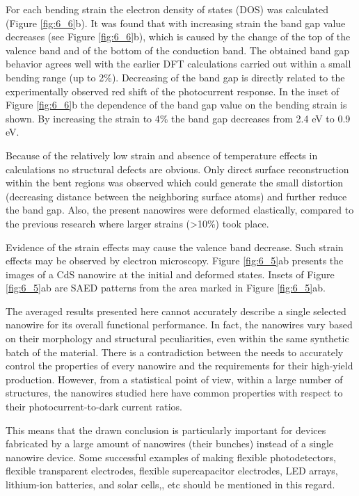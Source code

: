 For each bending strain the electron density of states (DOS) was calculated (Figure \ref{fig:6_6}b). It was found that with increasing strain the band gap value decreases (see Figure \ref{fig:6_6}b), which is caused by the change of the top of the valence band and of the bottom of the conduction band. The obtained band gap behavior agrees well with the earlier DFT calculations carried out within a small bending range (up to 2\%).\cite{Fu2011} Decreasing of the band gap is directly related to the experimentally observed red shift of the photocurrent response. In the inset of Figure \ref{fig:6_6}b the dependence of the band gap value on the bending strain is shown. By increasing the strain to 4\% the band gap decreases from 2.4 eV to 0.9 eV. 

Because of the relatively low strain and absence of temperature effects in calculations no structural defects are obvious. Only direct surface reconstruction within the bent regions was observed which could generate the small distortion (decreasing distance between the neighboring surface atoms) and further reduce the band gap. Also, the present nanowires were deformed elastically, compared to the previous research where larger strains (>10\%) took place.\cite{Wang2013}

Evidence of the strain effects may cause the valence band decrease. Such strain effects may be observed by electron microscopy. 
Figure \ref{fig:6_5}ab presents the images of a CdS nanowire at the initial and deformed states. 
Insets of Figure \ref{fig:6_5}ab are SAED patterns from the area marked in Figure \ref{fig:6_5}ab. 

The averaged results presented here cannot accurately describe a single selected nanowire for its overall functional performance. 
In fact, the nanowires vary based on their morphology and structural peculiarities, even within the same synthetic batch of the material. 
There is a contradiction between the needs to accurately control the properties of every nanowire and the requirements for their high-yield production. However, from a statistical point of view, within a large number of structures, the nanowires studied here have common properties with respect to their photocurrent-to-dark current ratios. 


This means that the drawn conclusion is particularly important for devices fabricated by a large amount of nanowires (their bunches) instead of a single nanowire device. 
Some successful examples of making flexible photodetectors,\cite{Xu2015b} flexible transparent electrodes,\cite{Liu2014a} flexible supercapacitor electrodes,\cite{Liu2014a} LED arrays,\cite{Wang2015a} lithium-ion batteries,\cite{Wang2015} and solar cells,\cite{Zhang2012}, etc should be mentioned in this regard. \\

